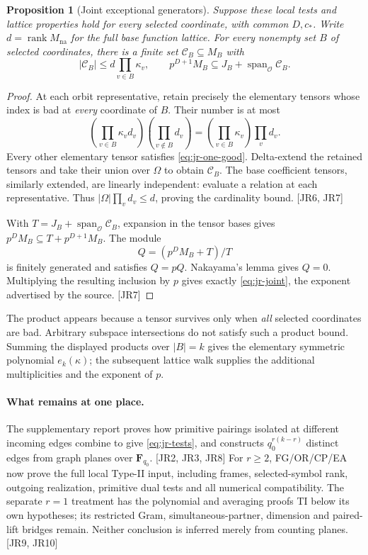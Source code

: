 \documentclass[11pt,a4paper]{article}
\numberwithin{equation}{section}
\newtheorem{proposition}[theorem]{Proposition}
\theoremstyle{remark}\newtheorem{remark}[theorem]{Remark}
\begin{document}
\begin{proposition}[Joint exceptional generators]\label{prop:jr-joint}
Suppose these local tests and lattice properties hold for every selected coordinate, with common $D,c_*$. Write $d=\operatorname{rank}M_{\mathrm{na}}$ for the full base function lattice. For every nonempty set $B$ of selected coordinates, there is a finite set $\mathcal C_B\subseteq M_B$ with
\begin{equation}\label{eq:jr-joint}
 |\mathcal C_B|\le d\prod_{v\in B}\kappa_v,
 \qquad
 p^{D+1}M_B\subseteq J_B+\operatorname{span}_{\mathcal O}\mathcal C_B.
\end{equation}
\end{proposition}
\begin{proof}
At each orbit representative, retain precisely the elementary tensors whose index is bad at \emph{every} coordinate of $B$. Their number is at most
\[
 \left(\prod_{v\in B}\kappa_vd_v\right)
 \left(\prod_{v\notin B}d_v\right)
   =\left(\prod_{v\in B}\kappa_v\right)\prod_v d_v.
\]
Every other elementary tensor satisfies \eqref{eq:jr-one-good}. Delta-extend the retained tensors and take their union over $\Omega$ to obtain $\mathcal C_B$. The base coefficient tensors, similarly extended, are linearly independent: evaluate a relation at each representative. Thus $|\Omega|\prod_vd_v\le d$, proving the cardinality bound. \textsf{[JR6, JR7]}

With $T=J_B+\operatorname{span}_{\mathcal O}\mathcal C_B$, expansion in the tensor bases gives $p^DM_B\subseteq T+p^{D+1}M_B$. The module
\[
 Q=(p^DM_B+T)/T
\]
is finitely generated and satisfies $Q=pQ$. Nakayama's lemma gives $Q=0$. Multiplying the resulting inclusion by $p$ gives exactly \eqref{eq:jr-joint}, the exponent advertised by the source. \textsf{[JR7]}
\end{proof}

The product appears because a tensor survives only when \emph{all} selected coordinates are bad. Arbitrary subspace intersections do not satisfy such a product bound. Summing the displayed products over $|B|=k$ gives the elementary symmetric polynomial $e_k(\kappa)$; the subsequent lattice walk supplies the additional multiplicities and the exponent of $p$.

\paragraph{What remains at one place.}
The supplementary report proves how primitive pairings isolated at different incoming edges combine to give \eqref{eq:jr-tests}, and constructs $q_0^{r(k-r)}$ distinct edges from graph planes over $\mathbf F_{q_0}$. \textsf{[JR2, JR3, JR8]} For $r\ge2$, FG/OR/CP/EA now prove the full local Type-II input, including frames, selected-symbol rank, outgoing realization, primitive dual tests and all numerical compatibility. The separate $r=1$ treatment has the polynomial and averaging proofs TI below its own hypotheses; its restricted Gram, simultaneous-partner, dimension and paired-lift bridges remain. Neither conclusion is inferred merely from counting planes. \textsf{[JR9, JR10]}
\end{document}
